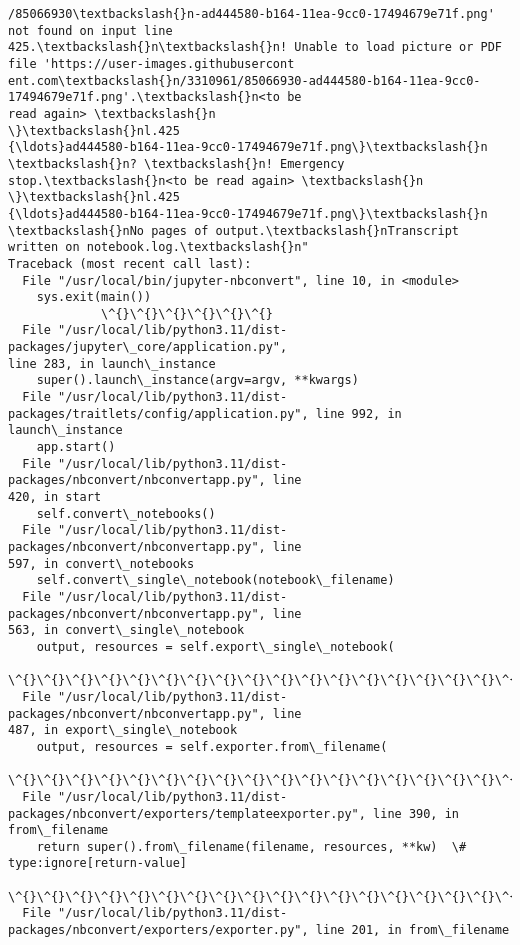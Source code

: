 \documentclass[11pt]{article}
\begin{document}
\begin{Verbatim}[commandchars=\\\{\}]
/85066930\textbackslash{}n-ad444580-b164-11ea-9cc0-17494679e71f.png' not found on input line
425.\textbackslash{}n\textbackslash{}n! Unable to load picture or PDF file 'https://user-images.githubusercont
ent.com\textbackslash{}n/3310961/85066930-ad444580-b164-11ea-9cc0-17494679e71f.png'.\textbackslash{}n<to be
read again> \textbackslash{}n                   \}\textbackslash{}nl.425
{\ldots}ad444580-b164-11ea-9cc0-17494679e71f.png\}\textbackslash{}n
\textbackslash{}n? \textbackslash{}n! Emergency stop.\textbackslash{}n<to be read again> \textbackslash{}n                   \}\textbackslash{}nl.425
{\ldots}ad444580-b164-11ea-9cc0-17494679e71f.png\}\textbackslash{}n
\textbackslash{}nNo pages of output.\textbackslash{}nTranscript written on notebook.log.\textbackslash{}n"
Traceback (most recent call last):
  File "/usr/local/bin/jupyter-nbconvert", line 10, in <module>
    sys.exit(main())
             \^{}\^{}\^{}\^{}\^{}\^{}
  File "/usr/local/lib/python3.11/dist-packages/jupyter\_core/application.py",
line 283, in launch\_instance
    super().launch\_instance(argv=argv, **kwargs)
  File "/usr/local/lib/python3.11/dist-
packages/traitlets/config/application.py", line 992, in launch\_instance
    app.start()
  File "/usr/local/lib/python3.11/dist-packages/nbconvert/nbconvertapp.py", line
420, in start
    self.convert\_notebooks()
  File "/usr/local/lib/python3.11/dist-packages/nbconvert/nbconvertapp.py", line
597, in convert\_notebooks
    self.convert\_single\_notebook(notebook\_filename)
  File "/usr/local/lib/python3.11/dist-packages/nbconvert/nbconvertapp.py", line
563, in convert\_single\_notebook
    output, resources = self.export\_single\_notebook(
                        \^{}\^{}\^{}\^{}\^{}\^{}\^{}\^{}\^{}\^{}\^{}\^{}\^{}\^{}\^{}\^{}\^{}\^{}\^{}\^{}\^{}\^{}\^{}\^{}\^{}\^{}\^{}\^{}
  File "/usr/local/lib/python3.11/dist-packages/nbconvert/nbconvertapp.py", line
487, in export\_single\_notebook
    output, resources = self.exporter.from\_filename(
                        \^{}\^{}\^{}\^{}\^{}\^{}\^{}\^{}\^{}\^{}\^{}\^{}\^{}\^{}\^{}\^{}\^{}\^{}\^{}\^{}\^{}\^{}\^{}\^{}\^{}\^{}\^{}\^{}
  File "/usr/local/lib/python3.11/dist-
packages/nbconvert/exporters/templateexporter.py", line 390, in from\_filename
    return super().from\_filename(filename, resources, **kw)  \#
type:ignore[return-value]
           \^{}\^{}\^{}\^{}\^{}\^{}\^{}\^{}\^{}\^{}\^{}\^{}\^{}\^{}\^{}\^{}\^{}\^{}\^{}\^{}\^{}\^{}\^{}\^{}\^{}\^{}\^{}\^{}\^{}\^{}\^{}\^{}\^{}\^{}\^{}\^{}\^{}\^{}\^{}\^{}\^{}\^{}\^{}\^{}\^{}\^{}\^{}\^{}
  File "/usr/local/lib/python3.11/dist-
packages/nbconvert/exporters/exporter.py", line 201, in from\_filename

\end{Verbatim}
\end{document}
